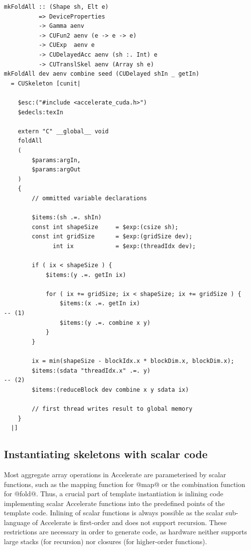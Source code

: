 \begin{lstlisting}[style=haskell
    ,float
    ,label=lst:mkfold
    ,caption={Accelerate CUDA skeleton for the @foldAll@ operation}]
mkFoldAll :: (Shape sh, Elt e)
          => DeviceProperties
          -> Gamma aenv
          -> CUFun2 aenv (e -> e -> e)
          -> CUExp  aenv e
          -> CUDelayedAcc aenv (sh :. Int) e
          -> CUTranslSkel aenv (Array sh e)
mkFoldAll dev aenv combine seed (CUDelayed shIn _ getIn)
  = CUSkeleton [cunit|

    $esc:("#include <accelerate_cuda.h>")
    $edecls:texIn

    extern "C" __global__ void
    foldAll
    (
        $params:argIn,
        $params:argOut
    )
    {
        // ommitted variable declarations

        $items:(sh .=. shIn)
        const int shapeSize     = $exp:(csize sh);
        const int gridSize      = $exp:(gridSize dev);
              int ix            = $exp:(threadIdx dev);

        if ( ix < shapeSize ) {
            $items:(y .=. getIn ix)

            for ( ix += gridSize; ix < shapeSize; ix += gridSize ) {
                $items:(x .=. getIn ix)                                                -- (1)
                $items:(y .=. combine x y)
            }
        }

        ix = min(shapeSize - blockIdx.x * blockDim.x, blockDim.x);
        $items:(sdata "threadIdx.x" .=. y)                                             -- (2)
        $items:(reduceBlock dev combine x y sdata ix)

        // first thread writes result to global memory
    }
  |]
\end{lstlisting}


\subsection{Instantiating skeletons with scalar code}
\label{sec:instantiating_skeletons}

Most aggregate array operations in Accelerate are parameterised by scalar
functions, such as the mapping function for @map@ or the combination
function for @fold@. Thus, a crucial part of template instantiation is
inlining \CUDA code implementing scalar Accelerate functions into the predefined
points of the template code. Inlining of scalar functions is always possible as
the scalar sub-language of Accelerate is first-order and does not support
recursion. These restrictions are necessary in order to generate \GPU code, as
\GPU hardware neither supports large stacks (for recursion) nor closures (for
higher-order functions).

